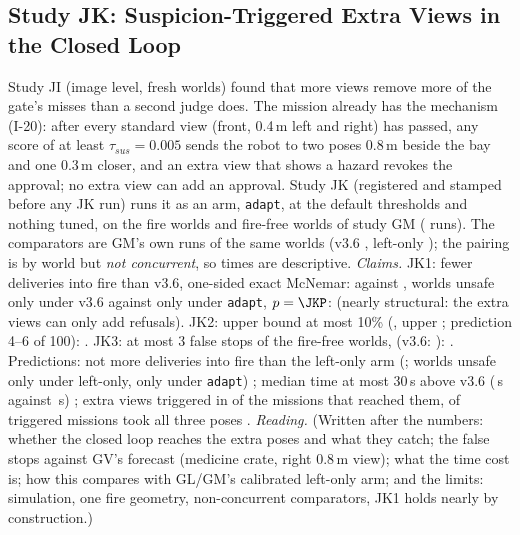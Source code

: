 \subsection{Study JK: Suspicion-Triggered Extra Views in the Closed Loop}\label{sec:moved-jk}
Study JI (image level, fresh worlds) found that more views remove more of the gate's misses than a second judge does. The mission already has the mechanism (I-20): after every standard view (front, 0.4\,m left and right) has passed, any score of at least $\tau_{sus}=0.005$ sends the robot to two poses 0.8\,m beside the bay and one 0.3\,m closer, and an extra view that shows a hazard revokes the approval; no extra view can add an approval. Study JK (registered and stamped before any JK run) runs it as an arm, \texttt{adapt}, at the default thresholds and nothing tuned, on the \JKWorlds{} fire worlds and \JKPlain{} fire-free worlds of study GM (\JKTrials{} runs). The comparators are GM's own runs of the same worlds (v3.6 \JKV{}, left-only \JKLeft{}); the pairing is by world but \emph{not concurrent}, so times are descriptive.
\emph{Claims.} JK1: fewer deliveries into fire than v3.6, one-sided exact McNemar: \JKAdapt{} against \JKV{}, \JKOnlyV{} worlds unsafe only under v3.6 against \JKOnlyAdapt{} only under \texttt{adapt}, $p=\JKP$: \JKOneHolds{} (nearly structural: the extra views can only add refusals). JK2: upper bound at most 10\% (\JKAdaptRate{}, upper \JKAdaptUpper; prediction 4--6 of 100): \JKTwoHolds. JK3: at most 3 false stops of the fire-free worlds, \JKFalseStops{} (v3.6: \JKFalseStopsV): \JKThreeHolds. Predictions: not more deliveries into fire than the left-only arm (\JKLeft{}; \JKOnlyLeft{} worlds unsafe only under left-only, \JKOnlyAdaptL{} only under \texttt{adapt}) \JKPredOneHolds; median time at most 30\,s above v3.6 (\JKTimeAdapt\,s against \JKTimeV\,s) \JKPredTwoHolds; extra views triggered in \JKTriggerShare{} of the \JKReached{} missions that reached them, \JKAllExtras{} of \JKTriggered{} triggered missions took all three poses \JKPredThreeHolds.
\emph{Reading.} (Written after the numbers: whether the closed loop reaches the extra poses and what they catch; the false stops against GV's forecast (medicine crate, right 0.8\,m view); what the time cost is; how this compares with GL/GM's calibrated left-only arm; and the limits: simulation, one fire geometry, non-concurrent comparators, JK1 holds nearly by construction.)
